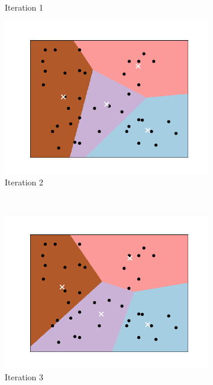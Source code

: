 \documentclass[a4paper, 12pt]{article}
\numberwithin{equation}{section}
\numberwithin{figure}{section}
\theoremstyle{definition}
\begin{document}
\begin{figure}[ht]
\begin{subfigure}[b]{0.49\textwidth}
		\vspace{-0.75em}
		\caption{Iteration 1}
	\end{subfigure}
	\begin{subfigure}[b]{0.49\textwidth}
		\centering 
		\includegraphics[scale=0.4]{graphics/k_means_iter2.png}
		\vspace{-0.75em}
		\caption{Iteration 2}
	\end{subfigure}~%
	\begin{subfigure}[b]{0.49\textwidth}
		\centering 
		\includegraphics[scale=0.4]{graphics/k_means_iter3.png}
		\vspace{-0.75em}
		\caption{Iteration 3}
	\end{subfigure}
	\begin{subfigure}[b]{0.49\textwidth}

\end{subfigure}
\end{figure}
\end{document}
